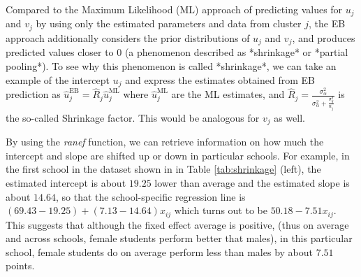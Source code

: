 Compared to the Maximum Likelihood (ML) approach of predicting values for $u_j$ and $v_j$ by using only the estimated parameters and data from cluster $j$, the EB approach additionally considers the prior distributions of $u_{j}$ and $v_{j}$, and produces predicted values closer to $0$ (a phenomenon described as *shrinkage* or *partial pooling*).  To see why this phenomenon is called *shrinkage*, we can take an example of the intercept $u_j$ and express the estimates obtained from EB prediction as $\hat{u}_j^{\text{EB}} = \hat{R}_j\hat{u}_j^{\text{ML}}$ where $\hat{u}_j^{\text{ML}}$ are the ML estimates, and $\hat{R}_j = \frac{\sigma_\alpha^2}{\sigma_\alpha^2 + \frac{\sigma_y^2}{n_j}}$ is the so-called Shrinkage factor. This would be analogous for $v_j$ as well.

By using the \textit{ranef} function, we can retrieve information on how much the intercept and slope are shifted up or down in particular schools. For example, in the first school in the dataset shown in in Table \ref{tab:shrinkage} (left), the estimated intercept is about $19.25$ lower than average and the estimated slope is about $14.64$, so that the school-specific regression line is $(69.43 - 19.25) + (7.13 - 14.64) x_{ij}$ which turns out to be $ 50.18 - 7.51  x_{ij}$. This suggests that although the fixed effect average is positive, (thus on average and across schools, female students perform better that males), in this particular school, female students do on average perform less than males by about $7.51$ points.

